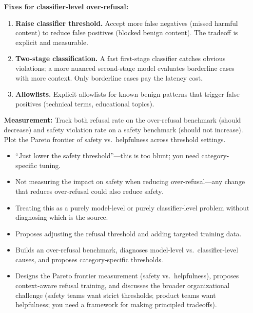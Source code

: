 \begin{interviewq}
\textbf{Fixes for classifier-level over-refusal:}
\begin{enumerate}
    \item \textbf{Raise classifier threshold.} Accept more false negatives (missed harmful content) to reduce false positives (blocked benign content). The tradeoff is explicit and measurable.
    \item \textbf{Two-stage classification.} A fast first-stage classifier catches obvious violations; a more nuanced second-stage model evaluates borderline cases with more context. Only borderline cases pay the latency cost.
    \item \textbf{Allowlists.} Explicit allowlists for known benign patterns that trigger false positives (technical terms, educational topics).
\end{enumerate}

\textbf{Measurement:} Track both refusal rate on the over-refusal benchmark (should decrease) and safety violation rate on a safety benchmark (should not increase). Plot the Pareto frontier of safety vs.\ helpfulness across threshold settings.

\redflags
\begin{itemize}
    \item ``Just lower the safety threshold''---this is too blunt; you need category-specific tuning.
    \item Not measuring the impact on safety when reducing over-refusal---any change that reduces over-refusal could also reduce safety.
    \item Treating this as a purely model-level or purely classifier-level problem without diagnosing which is the source.
\end{itemize}


\goodgreat
\begin{itemize}
    \item {} Proposes adjusting the refusal threshold and adding targeted training data.
    \item {} Builds an over-refusal benchmark, diagnoses model-level vs.\ classifier-level causes, and proposes category-specific thresholds.
    \item {} Designs the Pareto frontier measurement (safety vs.\ helpfulness), proposes context-aware refusal training, and discusses the broader organizational challenge (safety teams want strict thresholds; product teams want helpfulness; you need a framework for making principled tradeoffs).
\end{itemize}

\end{interviewq}


